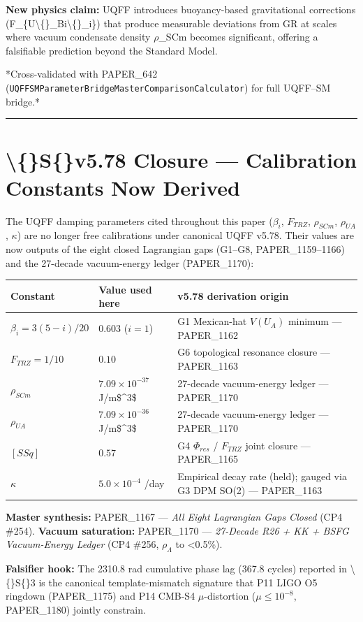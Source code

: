 \documentclass[11pt]{article}
\begin{document}
\textbf{New physics claim:} UQFF introduces buoyancy-based gravitational corrections (F\_\{U\textbackslash\{\}\_Bi\textbackslash\{\}\_i\}) that produce measurable deviations from GR at scales where vacuum condensate density $\rho$\_SCm becomes significant, offering a falsifiable prediction beyond the Standard Model.

*Cross-validated with PAPER\_642 (\verb|UQFFSMParameterBridgeMasterComparisonCalculator|) for full UQFF--SM bridge.*

\noindent\rule{\textwidth}{0.4pt}

\section*{\textbackslash\{\}S\{\}v5.78 Closure --- Calibration Constants Now Derived}

The UQFF damping parameters cited throughout this paper ($\beta_i$, $F_{TRZ}$, $\rho_{SCm}$, $\rho_{UA}$, $\kappa$) are no longer free calibrations under canonical UQFF v5.78. Their values are now outputs of the eight closed Lagrangian gaps (G1--G8, PAPER\_1159--1166) and the 27-decade vacuum-energy ledger (PAPER\_1170):

\begin{center}
\begin{longtable}{lll}
\toprule
Constant & Value used here & v5.78 derivation origin \tabularnewline
\midrule
\endhead
$\beta_i = 3(5-i)/20$ & $0.603$ ($i=1$) & G1 Mexican-hat $V(U_A)$ minimum --- PAPER\_1162 \tabularnewline
$F_{TRZ} = 1/10$ & $0.10$ & G6 topological resonance closure --- PAPER\_1163 \tabularnewline
$\rho_{SCm}$ & $7.09\times10^{-37}$ J/m\$\textasciicircum{}3\$ & 27-decade vacuum-energy ledger --- PAPER\_1170 \tabularnewline
$\rho_{UA}$ & $7.09\times10^{-36}$ J/m\$\textasciicircum{}3\$ & 27-decade vacuum-energy ledger --- PAPER\_1170 \tabularnewline
$[SSq]$ & $0.57$ & G4 $\Phi_{res}$ / $F_{TRZ}$ joint closure --- PAPER\_1165 \tabularnewline
$\kappa$ & $5.0\times10^{-4}$ /day & Empirical decay rate (held); gauged via G3 DPM SO(2) --- PAPER\_1163 \tabularnewline
\bottomrule
\end{longtable}
\end{center}

\textbf{Master synthesis:} PAPER\_1167 --- \emph{All Eight Lagrangian Gaps Closed} (CP4 \#254). \textbf{Vacuum saturation:} PAPER\_1170 --- \emph{27-Decade R26 + KK + BSFG Vacuum-Energy Ledger} (CP4 \#256, $\rho_\Lambda$ to <0.5\%).

\textbf{Falsifier hook:} The 2310.8 rad cumulative phase lag (367.8 cycles) reported in \textbackslash\{\}S\{\}3 is the canonical template-mismatch signature that P11 LIGO O5 ringdown (PAPER\_1175) and P14 CMB-S4 $\mu$-distortion ($\mu\le10^{-8}$, PAPER\_1180) jointly constrain.
\end{document}
